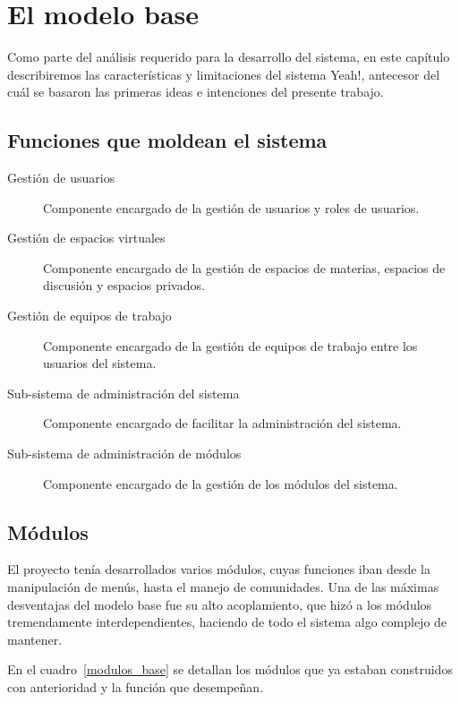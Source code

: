 \chapter{El modelo base}

Como parte del análisis requerido para la desarrollo del sistema, en este
capítulo describiremos las características y limitaciones del sistema Yeah!,
antecesor del cuál se basaron las primeras ideas e intenciones del presente
trabajo.

\section{Funciones que moldean el sistema}
\begin{description}
\item [Gestión de usuarios] Componente encargado de la gestión de usuarios y roles de usuarios.
\item [Gestión de espacios virtuales] Componente encargado de la gestión de espacios de materias, espacios de discusión y espacios privados.
\item [Gestión de equipos de trabajo] Componente encargado de la gestión de equipos de trabajo entre los usuarios del sistema.
\item [Sub-sistema de administración del sistema] Componente encargado de facilitar la administración del sistema.
\item [Sub-sistema de administración de módulos] Componente encargado de la gestión de los módulos del sistema.
\end{description}

\section{Módulos}
El proyecto tenía desarrollados varios módulos, cuyas funciones iban desde la manipulación de menús, hasta el manejo de
comunidades. Una de las máximas desventajas del modelo base fue su alto acoplamiento, que hizó a los módulos
tremendamente interdependientes, haciendo de todo el sistema algo complejo de mantener.

En el cuadro~\ref{modulos_base} se detallan los módulos que ya estaban construidos con anterioridad y la función que
desempeñan.

